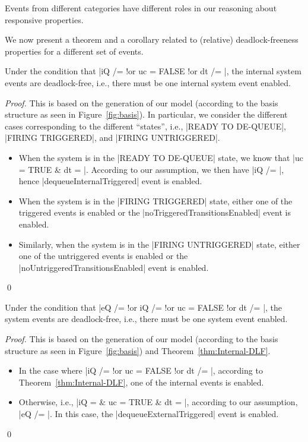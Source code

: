 Events from different categories have different roles in our reasoning
about responsive properties.

We now present a theorem and a corollary related to (relative)
deadlock-freeness properties for a different set of events.
\begin{theorem}
  \label{thm:Internal-DLF}
  Under the condition that %
  |iQ /= {} !or uc = FALSE !or dt /= {}|, %
  the internal system events are deadlock-free, i.e., there must be
  one internal system event enabled.
\end{theorem}
\begin{proof}
  This is based on the generation of our \EventB model (according to
  the basis structure as seen in Figure~\ref{fig:basis}).  In
  particular, we consider the different cases corresponding to the
  different ``states'', i.e., |READY TO DE-QUEUE|, |FIRING TRIGGERED|,
  and |FIRING UNTRIGGERED|.
  \begin{itemize}
  \item When the system is in the |READY TO DE-QUEUE| state, we know
    that %
    |uc = TRUE & dt = {}|.  %
    According to our assumption, we then have |iQ /= {}|, hence
    |dequeueInternalTriggered| event is enabled.
    
  \item When the system is in the |FIRING TRIGGERED| state,
    either one of the triggered events is enabled or the
    |noTriggeredTransitionsEnabled| event is enabled.
    
  \item Similarly, when the system is in the |FIRING UNTRIGGERED|
    state, either one of the untriggered events is enabled or the
    |noUntriggeredTransitionsEnabled| event is enabled.  
  \end{itemize}
  \qed
\end{proof}
    
\begin{corollary}
  Under the condition that %
  |eQ /= {} !or iQ /= {} !or uc = FALSE !or dt /= {}|, %
  the system events are deadlock-free, i.e., there must be
  one system event enabled.
\end{corollary}
\begin{proof}
  This is based on the generation of our \EventB model (according to
  the basis structure as seen in Figure~\ref{fig:basis}) and
  Theorem~\ref{thm:Internal-DLF}.
  \begin{itemize}
  \item In the case where |iQ /= {} !or uc = FALSE !or dt /= {}|,
    according to Theorem~\ref{thm:Internal-DLF}, one of the internal
    events is enabled.
    
  \item Otherwise, i.e., |iQ = {} & uc = TRUE & dt = {}|, according to
    our assumption, |eQ /= {}|. In this case, the
    |dequeueExternalTriggered| event is enabled.
  \end{itemize}
  \qed
\end{proof}

